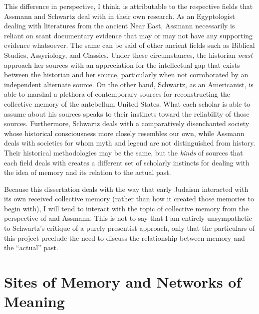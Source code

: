 This difference in perspective, I think, is attributable to the respective fields that Assmann and Schwartz deal with in their own research. As an Egyptologist dealing with literatures from the ancient Near East, Assmann necessarily is reliant on scant documentary evidence that may or may not have any supporting evidence whatsoever. The same can be said of other ancient fields such as Biblical Studies, Assyriology, and Classics. Under these circumstances, the historian \emph{must} approach her sources with an appreciation for the intellectual gap that exists between the historian and her source, particularly when not corroborated by an independent alternate source. On the other hand, Schwartz, as an Americanist, is able to marshal a plethora of contemporary sources for reconstructing the collective memory of the antebellum United States. What each scholar is able to assume about his sources speaks to their instincts toward the reliability of those sources. Furthermore, Schwartz deals with a comparatively disenchanted society whose historical consciousness more closely resembles our own, while Assmann deals with societies for whom myth and legend are not distinguished from history. Their historical methodologies may be the same, but the \emph{kinds} of sources that each field deals with creates a different set of scholarly instincts for dealing with the idea of memory and its relation to the actual past.  

Because this dissertation deals with the way that early Judaism interacted with its own received collective memory (rather than how it created those memories to begin with), I will tend to interact with the topic of collective memory from the perspective of \halbwachs and Assmann. This is not to say that I am entirely unsympathetic to Schwartz's critique of a purely presentist approach, only that the particulars of this project preclude the need to discuss the relationship between memory and the ``actual'' past.  


\section{Sites of Memory and Networks of Meaning}

